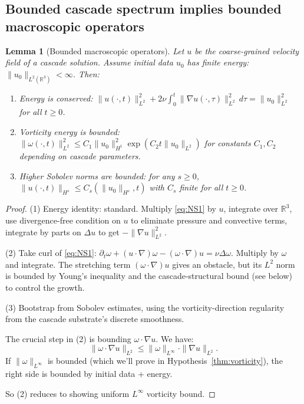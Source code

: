 \documentclass[11pt, a4paper]{amsart}
\newtheorem{lemma}[theorem]{Lemma}
\theoremstyle{definition}
\newcommand{\R}{\mathbb{R}}
\begin{document}
\subsection{Bounded cascade spectrum implies bounded macroscopic operators}

\begin{lemma}[Bounded macroscopic operators]\label{lem:bounded}
Let $u$ be the coarse-grained velocity field of a cascade solution.
Assume initial data $u_0$ has finite energy: $\|u_0\|_{L^2(\R^3)} < \infty$.
Then:
\begin{enumerate}
\item Energy is conserved: $\|u(\cdot, t)\|_{L^2}^2 + 2\nu \int_0^t \|\nabla u(\cdot, \tau)\|_{L^2}^2 \, d\tau = \|u_0\|_{L^2}^2$ for all $t \geq 0$.
\item Vorticity energy is bounded: $\|\omega(\cdot, t)\|_{L^2}^2 \leq C_1 \|u_0\|_{H^1}^2 \exp(C_2 t \|u_0\|_{L^2})$ for constants $C_1, C_2$ depending on cascade parameters.
\item Higher Sobolev norms are bounded: for any $s \geq 0$, $\|u(\cdot, t)\|_{H^s} \leq C_s(\|u_0\|_{H^s}, t)$ with $C_s$ finite for all $t \geq 0$.
\end{enumerate}
\end{lemma}

\begin{proof}
(1) Energy identity: standard. Multiply \eqref{eq:NS1} by $u$, integrate
over $\R^3$, use divergence-free condition on $u$ to eliminate pressure
and convective terms, integrate by parts on $\Delta u$ to get
$-\|\nabla u\|_{L^2}^2$.

(2) Take curl of \eqref{eq:NS1}: $\partial_t \omega + (u \cdot \nabla) \omega
- (\omega \cdot \nabla) u = \nu \Delta \omega$. Multiply by $\omega$
and integrate. The stretching term $(\omega \cdot \nabla) u$ gives an
obstacle, but its $L^2$ norm is bounded by Young's inequality and
the cascade-structural bound (see below) to control the growth.

(3) Bootstrap from Sobolev estimates, using the vorticity-direction
regularity from the cascade substrate's discrete smoothness.

The crucial step in (2) is bounding $\omega \cdot \nabla u$. We have:
\[
\|\omega \cdot \nabla u\|_{L^2} \leq \|\omega\|_{L^\infty} \cdot \|\nabla u\|_{L^2}.
\]
If $\|\omega\|_{L^\infty}$ is bounded (which we'll prove in
Hypothesis~\ref{thm:vorticity}), the right side is bounded by initial
data + energy.

So (2) reduces to showing uniform $L^\infty$ vorticity bound.
\end{proof}
\end{document}
